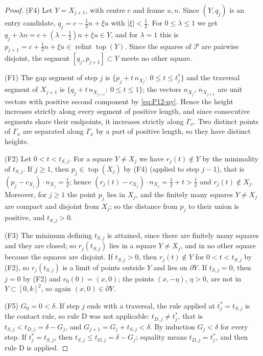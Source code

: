\documentclass[11pt]{amsart}
\newcommand{\cP}{\mathcal P}
\newcommand{\relint}{\operatorname{relint}}
\newcommand{\Top}{\operatorname{top}}
\theoremstyle{definition}
\theoremstyle{remark}
\numberwithin{equation}{section}
\begin{document}
\begin{proof}
(F4) Let $Y=X_{j+1}$, with centre $c$ and frame $u,n$. Since $(Y,q_j)$ is an entry candidate, $q_j=c-\frac12n+\xi u$ with $|\xi|<\frac12$. For $0\le\lambda\le1$ we get $q_j+\lambda n=c+(\lambda-\frac12)n+\xi u\in Y$, and for $\lambda=1$ this is $p_{j+1}=c+\frac12n+\xi u\in\relint\Top(Y)$. Since the squares of $\cP$ are pairwise disjoint, the segment $[q_j,p_{j+1}]\subset Y$ meets no other square.

(F1) The gap segment of step $j$ is $\{p_j+t\,n_{X_j}:\ 0\le t\le t^*_j\}$ and the traversal segment of $X_{j+1}$ is $\{q_j+t\,n_{X_{j+1}}:\ 0\le t\le1\}$; the vectors $n_{X_j}$, $n_{X_{j+1}}$ are unit vectors with positive second component by \eqref{eq:P12-ny}. Hence the height increases strictly along every segment of positive length, and since consecutive segments share their endpoints, it increases strictly along $\Gamma_x$. Two distinct points of $\Gamma_x$ are separated along $\Gamma_x$ by a part of positive length, so they have distinct heights.

(F2) Let $0<t<t_{S,j}$. For a square $Y\ne X_j$ we have $r_j(t)\notin Y$ by the minimality of $t_{S,j}$. If $j\ge1$, then $p_j\in\Top(X_j)$ by (F4) (applied to step $j-1$), that is $(p_j-c_{X_j})\cdot n_{X_j}=\frac12$; hence $(r_j(t)-c_{X_j})\cdot n_{X_j}=\frac12+t>\frac12$ and $r_j(t)\notin X_j$. Moreover, for $j\ge1$ the point $p_j$ lies in $X_j$, and the finitely many squares $Y\ne X_j$ are compact and disjoint from $X_j$; so the distance from $p_j$ to their union is positive, and $t_{S,j}>0$.

(F3) The minimum defining $t_{S,j}$ is attained, since there are finitely many squares and they are closed; so $r_j(t_{S,j})$ lies in a square $Y\ne X_j$, and in no other square because the squares are disjoint. If $t_{S,j}>0$, then $r_j(t)\notin Y$ for $0<t<t_{S,j}$ by (F2), so $r_j(t_{S,j})$ is a limit of points outside $Y$ and lies on $\partial Y$. If $t_{S,j}=0$, then $j=0$ by (F2) and $r_0(0)=(x,0)$; the points $(x,-\eta)$, $\eta>0$, are not in $Y\subset[0,k]^2$, so again $(x,0)\in\partial Y$.

(F5) $G_0=0<\delta$. If step $j$ ends with a traversal, the rule applied at $t^*_j=t_{S,j}$ is the contact rule, so rule D was not applicable: $t_{D,j}\ne t^*_j$, that is $t_{S,j}<t_{D,j}=\delta-G_j$, and $G_{j+1}=G_j+t_{S,j}<\delta$. By induction $G_j<\delta$ for every step. If $t^*_j=t_{S,j}$, then $t_{S,j}\le t_{D,j}=\delta-G_j$; equality means $t_{D,j}=t^*_j$, and then rule D is applied.


\end{proof}
\end{document}
